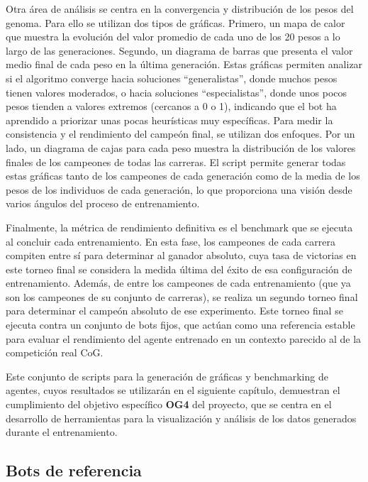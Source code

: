 Otra área de análisis se centra en la convergencia y distribución de los pesos del genoma. Para ello se utilizan dos tipos de gráficas. Primero, un mapa de calor que muestra la evolución del valor promedio de cada uno de los 20 pesos a lo largo de las generaciones. Segundo, un diagrama de barras que presenta el valor medio final de cada peso en la última generación. Estas gráficas permiten analizar si el algoritmo converge hacia soluciones ``generalistas'', donde muchos pesos tienen valores moderados, o hacia soluciones ``especialistas'', donde unos pocos pesos tienden a valores extremos (cercanos a 0 o 1), indicando que el bot ha aprendido a priorizar unas pocas heurísticas muy específicas. Para medir la consistencia y el rendimiento del campeón final, se utilizan dos enfoques. Por un lado, un diagrama de cajas para cada peso muestra la distribución de los valores finales de los campeones de todas las carreras. El script permite generar todas estas gráficas tanto de los campeones de cada generación como de la media de los pesos de los individuos de cada generación, lo que proporciona una visión desde varios ángulos del proceso de entrenamiento.

Finalmente, la métrica de rendimiento definitiva es el benchmark que se ejecuta al concluir cada entrenamiento. En esta fase, los campeones de cada carrera compiten entre sí para determinar al ganador absoluto, cuya tasa de victorias en este torneo final se considera la medida última del éxito de esa configuración de entrenamiento. Además, de entre los campeones de cada entrenamiento (que ya son los campeones de su conjunto de carreras), se realiza un segundo torneo final para determinar el campeón absoluto de ese experimento. Este torneo final se ejecuta contra un conjunto de bots fijos, que actúan como una referencia estable para evaluar el rendimiento del agente entrenado en un contexto parecido al de la competición real CoG.

Este conjunto de scripts para la generación de gráficas y benchmarking de agentes, cuyos resultados se utilizarán en el siguiente capítulo, demuestran el cumplimiento del objetivo específico \textbf{OG4} del proyecto, que se centra en el desarrollo de herramientas para la visualización y análisis de los datos generados durante el entrenamiento.

\subsection{Bots de referencia} \label{sec:bots_referencia}

